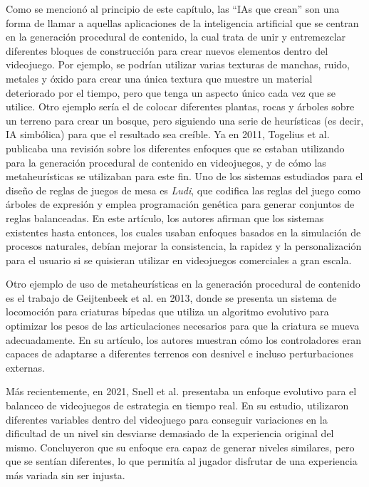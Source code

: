 Como se mencionó al principio de este capítulo, las ``IAs que crean'' son una forma de llamar a aquellas aplicaciones de la inteligencia artificial que se centran en la generación procedural de contenido, la cual trata de unir y entremezclar diferentes bloques de construcción para crear nuevos elementos dentro del videojuego. Por ejemplo, se podrían utilizar varias texturas de manchas, ruido, metales y óxido para crear una única textura que muestre un material deteriorado por el tiempo, pero que tenga un aspecto único cada vez que se utilice. Otro ejemplo sería el de colocar diferentes plantas, rocas y árboles sobre un terreno para crear un bosque, pero siguiendo una serie de heurísticas (es decir, IA simbólica) para que el resultado sea creíble. Ya en 2011, Togelius et al. \cite{togelius_search-based_2011} publicaba una revisión sobre los diferentes enfoques que se estaban utilizando para la generación procedural de contenido en videojuegos, y de cómo las metaheurísticas se utilizaban para este fin. Uno de los sistemas estudiados para el diseño de reglas de juegos de mesa es \textit{Ludi}, que codifica las reglas del juego como árboles de expresión y emplea programación genética para generar conjuntos de reglas balanceadas. En este artículo, los autores afirman que los sistemas existentes hasta entonces, los cuales usaban enfoques basados en la simulación de procesos naturales, debían mejorar la consistencia, la rapidez y la personalización para el usuario si se quisieran utilizar en videojuegos comerciales a gran escala.

Otro ejemplo de uso de metaheurísticas en la generación procedural de contenido es el trabajo de Geijtenbeek et al. \cite{geijtenbeek_flexible_2013} en 2013, donde se presenta un sistema de locomoción para criaturas bípedas que utiliza un algoritmo evolutivo para optimizar los pesos de las articulaciones necesarios para que la criatura se mueva adecuadamente. En su artículo, los autores muestran cómo los controladores eran capaces de adaptarse a diferentes terrenos con desnivel e incluso perturbaciones externas.

Más recientemente, en 2021, Snell et al. \cite{snell_evolutionary_2021} presentaba un enfoque evolutivo para el balanceo de videojuegos de estrategia en tiempo real. En su estudio, utilizaron diferentes variables dentro del videojuego para conseguir variaciones en la dificultad de un nivel sin desviarse demasiado de la experiencia original del mismo. Concluyeron que su enfoque era capaz de generar niveles similares, pero que se sentían diferentes, lo que permitía al jugador disfrutar de una experiencia más variada sin ser injusta.

